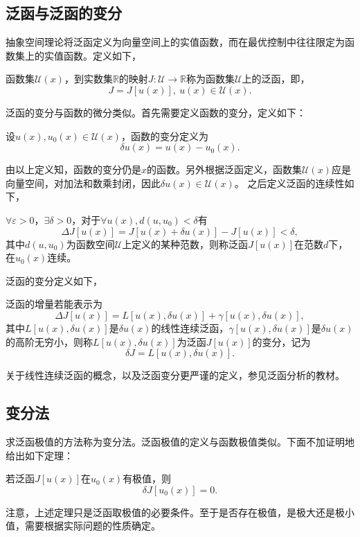 \subsection{泛函与泛函的变分}
抽象空间理论将泛函定义为向量空间上的实值函数，而在最优控制中往往限定为函数集上的实值函数。定义如下，
\begin{definition}[泛函]
函数集$\mathcal{U}(x)$，到实数集$\mathbb{R}$的映射$J: \mathcal{U}\rightarrow \mathbb{R}$称为函数集$\mathcal{U}$上的{\heiti 泛函}，即，
\begin{equation}
J=J[u(x)], \ u(x)\in \mathcal{U}(x).
\end{equation}
\end{definition}
泛函的变分与函数的微分类似。首先需要定义函数的变分，定义如下：
\begin{definition}[函数的变分]
设$u(x), u_0(x) \in \mathcal{U}(x)$，{\heiti 函数的变分}定义为
\begin{equation}
\delta u(x)=u(x) - u_0(x).
\end{equation}
\end{definition}
由以上定义知，函数的变分仍是$x$的函数。另外根据泛函定义，函数集$\mathcal{U}(x)$应是向量空间，对加法和数乘封闭，因此$\delta u(x)\in \mathcal{U}(x)$。
之后定义泛函的连续性如下，
\begin{definition}[泛函的连续性]
$\forall \varepsilon > 0$，$\exists \delta > 0$，对于$\forall u(x), d(u,u_0)<\delta$有
\begin{equation}
\Delta J[u(x)]=J[u(x)+\delta u(x)]-J[u(x)] < \delta,
\end{equation}
其中$d(u,u_0)$为函数空间$\mathcal{U}$上定义的某种范数，则称泛函$J[u(x)]$在范数$d$下，在$u_0(x)$连续。
\end{definition}
泛函的变分定义如下，
\begin{definition}[泛函的变分]
泛函的增量若能表示为
\begin{equation}
\Delta J[u(x)]=L[u(x),\delta u(x)] + \gamma[u(x), \delta u(x)],
\end{equation}
其中$L[u(x),\delta u(x)]$是$\delta u(x)$的线性连续泛函，$\gamma[u(x), \delta u(x)]$是$\delta u(x)$的高阶无穷小，则称$L[u(x),\delta u(x)]$为泛函$J[u(x)]$的变分，记为
\begin{equation}
\delta J = L[u(x),\delta u(x)].
\end{equation}
\end{definition}
关于线性连续泛函的概念，以及泛函变分更严谨的定义，参见泛函分析的教材\cite{PETERD2007Functional}。

\subsection{变分法}
求泛函极值的方法称为变分法。泛函极值的定义与函数极值类似。下面不加证明地给出如下定理：
\begin{theorem}
若泛函$J[u(x)]$在$u_0(x)$有极值，则
\begin{equation}
\delta J[u_0(x)]=0.
\end{equation}
\end{theorem}
注意，上述定理只是泛函取极值的必要条件。至于是否存在极值，是极大还是极小值，需要根据实际问题的性质确定。

